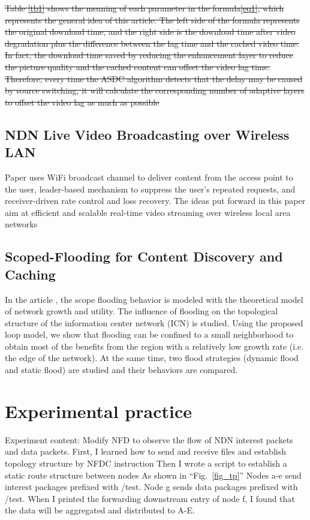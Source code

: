\documentclass[conference]{IEEEtran}
\providecommand{\DIFdel}[1]{{\protect\color{red}\sout{#1}}}                      %
\providecommand{\DIFdelbegin}{} %
\providecommand{\DIFdelend}{} %
\newcommand{\DIFscaledelfig}{0.5}
\newlength{\DIFdelgraphicswidth} %
\newlength{\DIFdelgraphicsheight} %
\newcommand{\DIFdelincludegraphics}[2][]{%
\sbox{\DIFdelgraphicsbox}{\DIFOincludegraphics[#1]{#2}}%
\settoboxwidth{\DIFdelgraphicswidth}{\DIFdelgraphicsbox} %
\settoboxtotalheight{\DIFdelgraphicsheight}{\DIFdelgraphicsbox} %
\scalebox{\DIFscaledelfig}{%
\parbox[b]{\DIFdelgraphicswidth}{\usebox{\DIFdelgraphicsbox}\\[-\baselineskip] \rule{\DIFdelgraphicswidth}{0em}}\llap{\resizebox{\DIFdelgraphicswidth}{\DIFdelgraphicsheight}{%
\setlength{\unitlength}{\DIFdelgraphicswidth}%
\begin{picture}(1,1)%
\thicklines\linethickness{2pt} %
{\color[rgb]{1,0,0}\put(0,0){\framebox(1,1){}}}%
{\color[rgb]{1,0,0}\put(0,0){\line( 1,1){1}}}%
{\color[rgb]{1,0,0}\put(0,1){\line(1,-1){1}}}%
\end{picture}%
}\hspace*{3pt}}} %
} %
\DeclareRobustCommand{\DIFdelbegin}{\DIFOdelbegin \let\includegraphics\DIFdelincludegraphics} %
\DeclareRobustCommand{\DIFdelend}{\DIFOaddend \let\includegraphics\DIFOincludegraphics} %
\begin{document}
\DIFdelbegin \DIFdel{Table \ref{tb1} shows the meaning of each parameter in the formula\ref{eq1}, which represents the general idea of this article. The left side of the formula represents the original download time, and the right side is the download time after video degradation plus the difference between the lag time and the cached video time. In fact, the download time saved by reducing the enhancement layer to reduce the picture quality and the cached content can offset the video lag time. Therefore, every time the ASDC algorithm detects that the delay may be caused by source switching, it will calculate the corresponding number of adaptive layers to offset the video lag as much as possible
}%

\DIFdelend \subsection{NDN Live Video Broadcasting over Wireless LAN}
Paper \cite{b4} uses WiFi broadcast channel to deliver content from the access point to the user, leader-based mechanism to suppress the user's repeated requests, and receiver-driven rate control and loss recovery.
The ideas put forward in this paper aim at efficient and scalable real-time video streaming over wireless local area networks

\subsection{Scoped-Flooding for Content Discovery and Caching}
In the article  \cite{b5}, the scope flooding behavior is modeled with the theoretical model of network growth and utility. The influence of flooding on the topological structure of the information center network (ICN) is studied. Using the proposed loop model, we show that flooding can be confined to a small neighborhood to obtain most of the benefits from the region with a relatively low growth rate (i.e. the edge of the network). At the same time, two flood strategies (dynamic flood and static flood) are studied and their behaviors are compared.
\section{Experimental practice}
Experiment content: Modify NFD to observe the flow of NDN interest packets and data packets. First, I learned how to send and receive files and establish topology structure by NFDC instruction
Then I wrote a script  to establish  a static route structure between nodes
As shown in ``Fig.~\ref{fig_tp}''
Nodes a-e send interest packages prefixed with /test. Node g sends data packages prefixed with /test. When I printed the forwarding downstream entry of node f, I found that the data will be aggregated and distributed to A-E.
\end{document}
